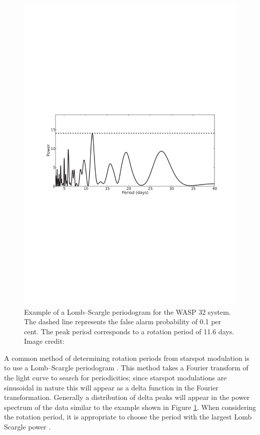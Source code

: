 \begin{figure}
    \centering
    \includegraphics[scale=0.5]{Figures/1-Introduction/brothwell_2014_LSP.pdf}
    \caption[Lomb Scargle periodogram example]{Example of a Lomb--Scargle periodogram for the WASP 32 system. The dashed line represents the false alarm probability of 0.1 per cent. The peak period corresponds to a rotation period of 11.6 days. Image credit: \citet{Brothwell_etal_2014}}
    \label{fig:LS_periodogram_example}
\end{figure}

A common method of determining rotation periods from starspot modulation is to use a Lomb--Scargle periodogram \citep{Lomb_1976,Scargle_1982}. This method takes a Fourier transform of the light curve to search for periodicities; since starspot modulations are sinusoidal in nature this will appear as a delta function in the Fourier transformation. Generally a distribution of delta peaks will appear in the power spectrum of the data similar to the example shown in Figure \ref{fig:LS_periodogram_example}. When considering the rotation period, it is appropriate to choose the period with the largest Lomb Scargle power \citep{Nielsen_Karoff_2012}.

